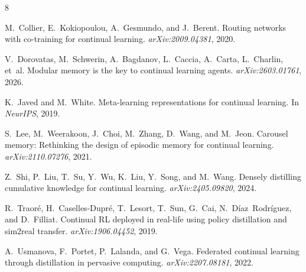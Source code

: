 \documentclass[11pt]{article}
\begin{document}

\begin{thebibliography}{8}

M.~Collier, E.~Kokiopoulou, A.~Gesmundo, and J.~Berent.
\newblock Routing networks with co-training for continual learning.
\newblock \emph{arXiv:2009.04381}, 2020.

V.~Dorovatas, M.~Schwerin, A.~Bagdanov, L.~Caccia, A.~Carta, L.~Charlin, et~al.
\newblock Modular memory is the key to continual learning agents.
\newblock \emph{arXiv:2603.01761}, 2026.

K.~Javed and M.~White.
\newblock Meta-learning representations for continual learning.
\newblock In \emph{NeurIPS}, 2019.

S.~Lee, M.~Weerakoon, J.~Choi, M.~Zhang, D.~Wang, and M.~Jeon.
\newblock Carousel memory: Rethinking the design of episodic memory for continual learning.
\newblock \emph{arXiv:2110.07276}, 2021.

Z.~Shi, P.~Liu, T.~Su, Y.~Wu, K.~Liu, Y.~Song, and M.~Wang.
\newblock Densely distilling cumulative knowledge for continual learning.
\newblock \emph{arXiv:2405.09820}, 2024.

R.~Traor\'e, H.~Caselles-Dupr\'e, T.~Lesort, T.~Sun, G.~Cai, N.~D\'iaz~Rodr\'iguez, and D.~Filliat.
\newblock Continual RL deployed in real-life using policy distillation and sim2real transfer.
\newblock \emph{arXiv:1906.04452}, 2019.

A.~Usmanova, F.~Portet, P.~Lalanda, and G.~Vega.
\newblock Federated continual learning through distillation in pervasive computing.
\newblock \emph{arXiv:2207.08181}, 2022.

\end{thebibliography}
\end{document}
